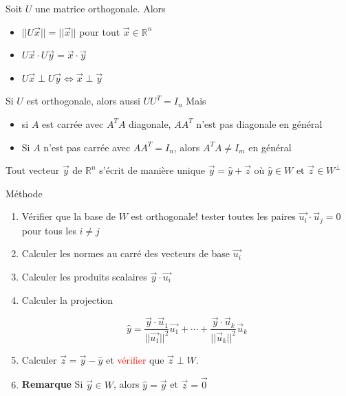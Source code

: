     \begin{theoreme}
        Soit $U$ une matrice orthogonale. Alors
        \begin{itemize}
            \item $||U\vec{x}|| = ||\vec{x}||$ pour tout $\vec{x} \in \mathbb{R}^n$
            \item $U\vec{x}\cdot U\vec{y} = \vec{x}\cdot \vec{y}$
            \item $U\vec{x} \perp U\vec{y} \Leftrightarrow \vec{x}\perp \vec{y}$
        \end{itemize}
    \end{theoreme}
    Si $U$ est orthogonale, alors aussi $UU^T = I_n$ Mais
    \begin{itemize}
        \item si $A$ est carrée avec $A^TA$ diagonale, $AA^T$ n'est pas diagonale en général
        \item Si $A$ n'est pas carrée avec $AA^T = I_n$, alors $A^TA \neq I_m$ en général
    \end{itemize}
    \begin{theoreme}
        Tout vecteur $\vec{y}$ de $\mathbb{R}^n$ s'écrit de manière unique $\vec{y} = \hat{y}+\vec{z}$ où $\hat{y}\in W$ et $\vec{z}\in W^\perp$
    \end{theoreme}
\begin{parag}{Méthode}
    \begin{enumerate}
        \item Vérifier que la base de $W$ est orthogonale! tester toutes les paires $\vec{u_i}\cdot\vec{u}_j = 0$ pour tous les $i \neq j$
        \item Calculer les normes au carré des vecteurs de base $\vec{u_i}$
        \item Calculer les produits scalaires $\vec{y}\cdot\vec{u_i}$
        \item Calculer la projection
        \begin{formule}
            \[\hat{y} = \frac{\vec{y}\cdot \vec{u}_1}{||\vec{u_1}||^2}\vec{u_1} + \cdots + \frac{\vec{y}\cdot\vec{u}_k}{||\vec{u}_k||^2}\vec{u}_k\]
        \end{formule}
        \item Calculer $\vec{z} = \vec{y}-\hat{y}$ et \textcolor{red}{vérifier} que $\vec{z}\perp W$.
        \item \textbf{Remarque} Si $\vec{y} \in W$, alors $\hat{y} = \vec{y}$ et $\vec{z} = \vec{0}$
    \end{enumerate}
\end{parag}
